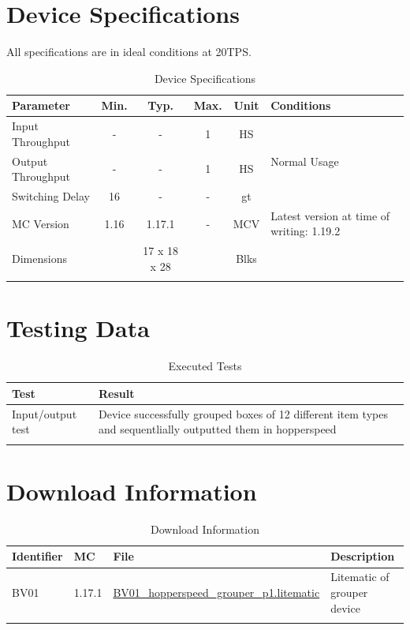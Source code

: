 \documentclass[10pt]{datasheet}
\begin{document}
\onecolumn

\section{Device Specifications}
All specifications are in ideal conditions at 20TPS.

\begin{table}[h]
\caption{Device Specifications}
\begin{tabularx}{\textwidth}{l | c c c | c | X}
    \thickhline
    \textbf{Parameter} & \textbf{Min.} & \textbf{Typ.} & \textbf{Max.} &
    \textbf{Unit} & \textbf{Conditions} \\
    \hline
    Input Throughput  & - & - & 1 & HS & \multirow{3}{*}{Normal Usage} \\
    Output Throughput  & - & - & 1 & HS & \\
    Switching Delay & 16 & - & - & gt & \\
    \hline
    MC Version & 1.16 & 1.17.1 & - & MCV & Latest version at time of writing: 1.19.2\\
    \hline
    Dimensions & & 17 x 18 x 28 & & Blks & \\
    \thickhline
\end{tabularx}
\end{table}

\section{Testing Data}
\begin{table}[h]
\caption{Executed Tests}
\begin{tabularx}{\textwidth}{X | X}
    \thickhline
    \textbf{Test} & \textbf{Result} \\
    \hline
    Input/output test & Device successfully grouped boxes of 12 different item types and sequentlially outputted them in hopperspeed\\
    \thickhline
\end{tabularx}
\end{table}

\section{Download Information}
\begin{table}[h]
    \caption{Download Information}
    \begin{tabularx}{\textwidth}{l | l | l | X}
        \thickhline
        \textbf{Identifier} & \textbf{MC} & \textbf{File} & \textbf{Description} \\
        \hline
        BV01 & 1.17.1 & \href{https://github.com/Soontech-Annals/Archive/blob/8413f90a054b6c415703bae02badeba7541344f6/Archive/box-variable/BV01\%20Simple\%20Hopperspeed\%20Grouper/BV01\_hopperspeed\_grouper\_p1.litematic?raw=1}{BV01\_hopperspeed\_grouper\_p1.litematic} & Litematic of grouper device \\
        \thickhline
    \end{tabularx}
\end{table}
\end{document}
